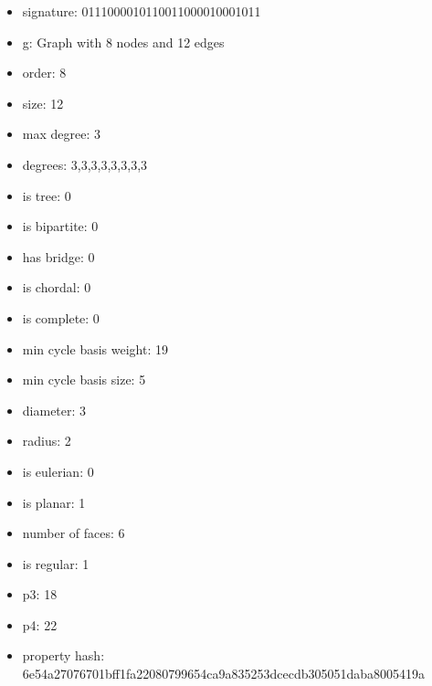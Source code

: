 \begin{itemize}
\item signature: 0111000010110011000010001011
\item g: Graph with 8 nodes and 12 edges
\item order: 8
\item size: 12
\item max degree: 3
\item degrees: 3,3,3,3,3,3,3,3
\item is tree: 0
\item is bipartite: 0
\item has bridge: 0
\item is chordal: 0
\item is complete: 0
\item min cycle basis weight: 19
\item min cycle basis size: 5
\item diameter: 3
\item radius: 2
\item is eulerian: 0
\item is planar: 1
\item number of faces: 6
\item is regular: 1
\item p3: 18
\item p4: 22
\item property hash: 6e54a27076701bff1fa22080799654ca9a835253dcecdb305051daba8005419a
\end{itemize}
\newpage
\begin{figure}
\end{figure}
